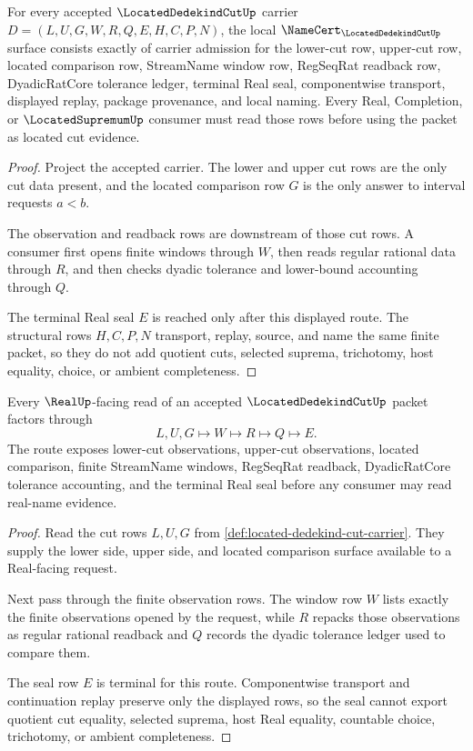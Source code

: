\begin{theorem}
\label{thm:located-dedekind-cut-namecert-obligations}
For every accepted $\LocatedDedekindCutUp$ carrier $D=(L,U,G,W,R,Q,E,H,C,P,N)$, the local $\NameCert_{\LocatedDedekindCutUp}$ surface consists exactly of carrier admission for the lower-cut row, upper-cut row, located comparison row, StreamName window row, RegSeqRat readback row, DyadicRatCore tolerance ledger, terminal Real seal, componentwise transport, displayed replay, package provenance, and local naming. Every Real, Completion, or $\LocatedSupremumUp$ consumer must read those rows before using the packet as located cut evidence.
\end{theorem}
\begin{proof}
Project the accepted carrier. The lower and upper cut rows are the only cut data present, and the located comparison row $G$ is the only answer to interval requests $a<b$.

The observation and readback rows are downstream of those cut rows. A consumer first opens finite windows through $W$, then reads regular rational data through $R$, and then checks dyadic tolerance and lower-bound accounting through $Q$.

The terminal Real seal $E$ is reached only after this displayed route. The structural rows $H,C,P,N$ transport, replay, source, and name the same finite packet, so they do not add quotient cuts, selected suprema, trichotomy, host equality, choice, or ambient completeness.
\end{proof}

\begin{theorem}
\label{thm:located-dedekind-cut-real-seal-route}
Every $\RealUp$-facing read of an accepted $\LocatedDedekindCutUp$ packet factors through
$$
L,U,G \longmapsto W \longmapsto R \longmapsto Q \longmapsto E .
$$
The route exposes lower-cut observations, upper-cut observations, located comparison, finite StreamName windows, RegSeqRat readback, DyadicRatCore tolerance accounting, and the terminal Real seal before any consumer may read real-name evidence.
\end{theorem}
\begin{proof}
Read the cut rows $L,U,G$ from \autoref{def:located-dedekind-cut-carrier}. They supply the lower side, upper side, and located comparison surface available to a Real-facing request.

Next pass through the finite observation rows. The window row $W$ lists exactly the finite observations opened by the request, while $R$ repacks those observations as regular rational readback and $Q$ records the dyadic tolerance ledger used to compare them.

The seal row $E$ is terminal for this route. Componentwise transport and continuation replay preserve only the displayed rows, so the seal cannot export quotient cut equality, selected suprema, host Real equality, countable choice, trichotomy, or ambient completeness.
\end{proof}

